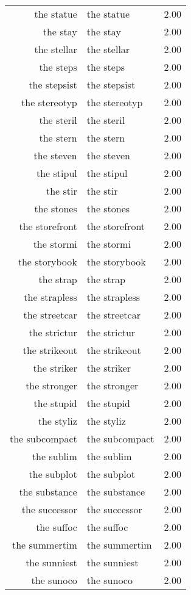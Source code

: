 \begin{table}[ht]
\begin{tabular}{rlr}
  the statue & the statue & 2.00 \\ 
  the stay & the stay & 2.00 \\ 
  the stellar & the stellar & 2.00 \\ 
  the steps & the steps & 2.00 \\ 
  the stepsist & the stepsist & 2.00 \\ 
  the stereotyp & the stereotyp & 2.00 \\ 
  the steril & the steril & 2.00 \\ 
  the stern & the stern & 2.00 \\ 
  the steven & the steven & 2.00 \\ 
  the stipul & the stipul & 2.00 \\ 
  the stir & the stir & 2.00 \\ 
  the stones & the stones & 2.00 \\ 
  the storefront & the storefront & 2.00 \\ 
  the stormi & the stormi & 2.00 \\ 
  the storybook & the storybook & 2.00 \\ 
  the strap & the strap & 2.00 \\ 
  the strapless & the strapless & 2.00 \\ 
  the streetcar & the streetcar & 2.00 \\ 
  the strictur & the strictur & 2.00 \\ 
  the strikeout & the strikeout & 2.00 \\ 
  the striker & the striker & 2.00 \\ 
  the stronger & the stronger & 2.00 \\ 
  the stupid & the stupid & 2.00 \\ 
  the styliz & the styliz & 2.00 \\ 
  the subcompact & the subcompact & 2.00 \\ 
  the sublim & the sublim & 2.00 \\ 
  the subplot & the subplot & 2.00 \\ 
  the substance & the substance & 2.00 \\ 
  the successor & the successor & 2.00 \\ 
  the suffoc & the suffoc & 2.00 \\ 
  the summertim & the summertim & 2.00 \\ 
  the sunniest & the sunniest & 2.00 \\ 
  the sunoco & the sunoco & 2.00 \\ 

\end{tabular}
\end{table}
